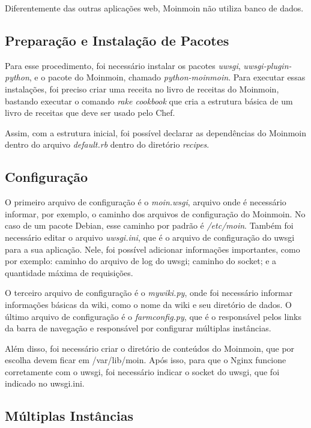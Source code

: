 Diferentemente das outras aplicações web, Moinmoin não utiliza banco de dados.

\subsection{Preparação e Instalação de Pacotes}

Para esse procedimento, foi necessário instalar os pacotes \textit{uwsgi},
\textit{uwsgi-plugin-python}, e o pacote do Moinmoin, chamado \textit{python-moinmoin}.
Para executar essas instalações, foi preciso criar uma receita no livro de receitas
do Moinmoin, bastando executar o comando \textit{rake cookbook} que cria a
estrutura básica de um livro de receitas que deve ser usado pelo Chef.

Assim, com a estrutura inicial, foi possível declarar as dependências do Moinmoin
dentro do arquivo \textit{default.rb} dentro do diretório \textit{recipes}.

\subsection{Configuração}

O primeiro arquivo de configuração é o \textit{moin.wsgi}, arquivo onde é necessário
informar, por exemplo, o caminho dos arquivos de configuração do Moinmoin. No caso
de um pacote Debian, esse caminho por padrão é  \textit{/etc/moin}. Também foi necessário 
editar o arquivo \textit{uwsgi.ini}, que é o arquivo de configuração
do uwsgi para a sua aplicação. Nele, foi possível adicionar informações importantes, como
por exemplo: caminho do arquivo de log do uwsgi; caminho do socket;
e a quantidade máxima de requisições.

O terceiro arquivo de configuração é o \textit{mywiki.py}, onde foi necessário
informar informações básicas da wiki, como o nome da wiki e seu diretório de dados. 
O último arquivo de configuração é o \textit{farmconfig.py}, que é o responsável pelos 
links da barra de navegação e responsável por configurar múltiplas instâncias.

Além disso, foi necessário criar o diretório de conteúdos do Moinmoin, que por
escolha devem ficar em /var/lib/moin. Após isso, para que o Nginx funcione corretamente
com o uwsgi, foi necessário indicar o socket do uwsgi, que foi indicado no uwsgi.ini.

\subsection{Múltiplas Instâncias}


